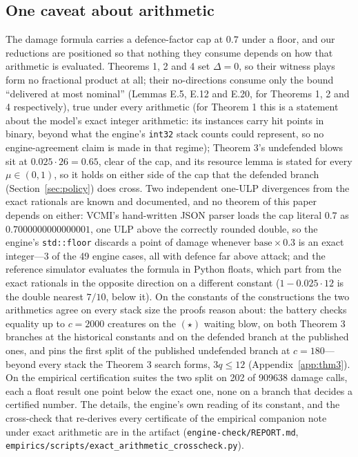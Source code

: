 \documentclass[11pt,a4paper]{article}
\theoremstyle{plain}
\theoremstyle{definition}
\theoremstyle{plain}
\theoremstyle{definition}
\theoremstyle{remark}
\newcommand{\src}[1]{\texttt{#1}}
\begin{document}
\subsection{One caveat about arithmetic}\label{sec:floats}

The damage formula carries a defence-factor cap at $0.7$ under a floor, and our reductions
are positioned so that nothing they consume depends on how that arithmetic is evaluated.
Theorems 1, 2 and 4 set $\Delta=0$, so their witness plays form no fractional product at
all; their no-directions consume only the bound ``delivered at most nominal''
(Lemmas E.5, E.12 and E.20, for Theorems 1, 2 and 4 respectively), true under every
arithmetic (for Theorem 1 this is a statement about the
model's exact integer arithmetic: its instances carry hit points in binary, beyond what the
engine's \src{int32} stack counts could represent, so no engine-agreement claim is made in
that regime); Theorem 3's undefended blows sit at $0.025\cdot 26=0.65$, clear of the cap,
and its resource lemma is stated for every $\mu\in(0,1)$, so it holds on either side of the
cap that the defended branch (Section~\ref{sec:policy}) does cross. Two independent one-ULP
divergences from the exact rationals are known and documented, and no theorem of this paper
depends on either: VCMI's hand-written JSON parser loads the cap literal $0.7$ as
$0.7000000000000001$, one ULP above the correctly rounded double, so the engine's
\src{std::floor} discards a point of damage whenever $\text{base}\times 0.3$ is an exact
integer---3 of the 49 engine cases, all with defence far above attack; and the reference
simulator evaluates the formula in Python floats, which part from the exact rationals in the
opposite direction on a different constant ($1-0.025\cdot 12$ is the double nearest $7/10$,
below it). On the constants of the constructions the two arithmetics agree on every stack
size the proofs reason about: the battery checks equality up to $c=2000$ creatures on the
$(\star)$ waiting blow, on both Theorem 3 branches at the historical constants and on the
defended branch at the published ones, and pins the first split of the published undefended
branch at $c=180$---beyond every stack the Theorem 3 search forms, $3q\le 12$
(Appendix~\ref{app:thm3}). On the empirical certification suites the two split on 202 of
909638 damage calls, each a float result one point below the exact one, none on a branch
that decides a certified number. The details, the engine's own reading of its constant, and
the cross-check that re-derives every certificate of the empirical companion note under
exact arithmetic are in the artifact (\src{engine-check/REPORT.md},
\src{empirics/scripts/exact\_\allowbreak arithmetic\_\allowbreak crosscheck.py}).
\end{document}
